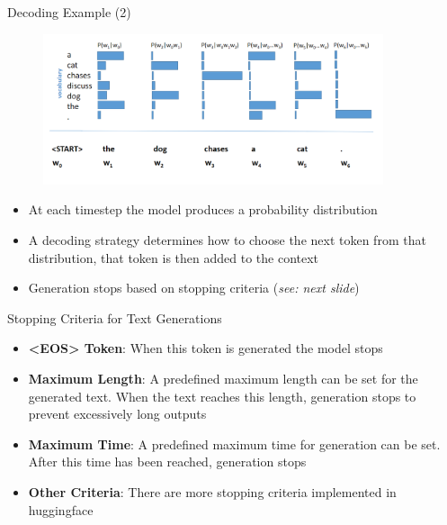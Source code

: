 \begin{vbframe}{Decoding Example (2)}

\begin{figure}
    \centering
    \includegraphics[width=10cm]{figure/arlm.png}
\end{figure}

\begin{itemize}
    \item At each timestep the model produces a probability distribution
    \item A decoding strategy determines how to choose the next token from that distribution, that token is then added to the context
    \item Generation stops based on stopping criteria (\textit{see: next slide})
\end{itemize}
    
\end{vbframe}



\begin{vbframe}{Stopping Criteria for Text Generations}

\vfill

\begin{itemize}
    \item \textbf{<EOS> Token}: When this token is generated the model stops
    \item \textbf{Maximum Length}: A predefined maximum length can be set for the generated text. When the text reaches this length, generation stops to prevent excessively long outputs
    \item \textbf{Maximum Time}: A predefined maximum time for generation can be set. After this time has been reached, generation stops
    \item \textbf{Other Criteria}: There are more stopping criteria implemented in huggingface 
\end{itemize}

\vfill

\end{vbframe}

